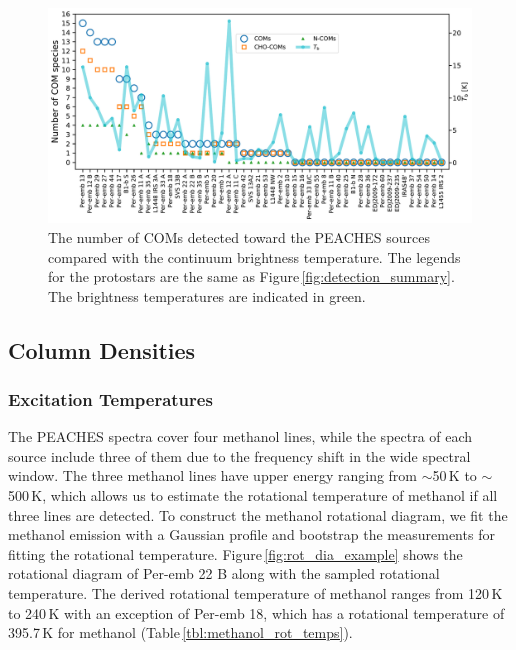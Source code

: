 \documentclass[twocolumn]{aastex62}
\begin{document}
\begin{figure}[htbp!]
  \centering
  \includegraphics[width=\textwidth]{detection_summary_Tb.pdf}
  \caption{The number of COMs detected toward the PEACHES sources compared with the continuum brightness temperature.  The legends for the protostars are the same as Figure\,\ref{fig:detection_summary}.  The brightness temperatures are indicated in green.}
  \label{fig:detection_summary_Tb}
\end{figure}

\subsection{Column Densities}
\subsubsection{Excitation Temperatures}
The PEACHES spectra cover four methanol lines, while the spectra of each source include three of them due to the frequency shift in the wide spectral window.  The three methanol lines have upper energy ranging from $\sim$50\,K to $\sim$500\,K, which allows us to estimate the rotational temperature of methanol if all three lines are detected.  To construct the methanol rotational diagram, we fit the methanol emission with a Gaussian profile and bootstrap the measurements for fitting the rotational temperature.  Figure\,\ref{fig:rot_dia_example} shows the rotational diagram of Per-emb 22 B along with the sampled rotational temperature.  The derived rotational temperature of methanol ranges from 120\,K to 240\,K with an exception of Per-emb 18, which has a rotational temperature of 395.7\,K for methanol (Table\,\ref{tbl:methanol_rot_temps}).
\end{document}
